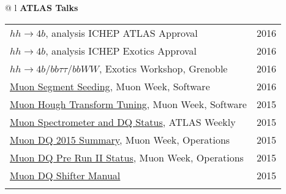 \documentclass[letterpaper,11pt,oneside]{article}
\newcommand{\blue}[1]{\textcolor[rgb]{0,0,0.9}{#1}}
\begin{document}
\begin{flushleft}
\begin{tabular}{@{} l}
     \textbf{ATLAS Talks} \\
     \begin{tabular}{@{} l l }
     \blue{\href{https://indico.cern.ch/event/558982/contributions/2255258}{$hh\to4b$}}, analysis ICHEP ATLAS Approval & 2016\\
     \blue{\href{https://indico.cern.ch/event/556566/contributions/2244051}{$hh\to4b$}}, analysis ICHEP Exotics Approval & 2016\\
     \blue{\href{https://indico.cern.ch/event/465157/contributions/1972449}{$hh\to4b / bb\tau\tau / bbWW$}}, Exotics Workshop, Grenoble & 2016\\
      \blue{\href{https://indico.cern.ch/event/570115/contributions/2305843}{Muon Segment Seeding}}, Muon Week, Software & 2016\\
     \blue{\href{https://indico.cern.ch/event/465396/contributions/1984207}{Muon Hough Transform Tuning}}, Muon Week, Software & 2015\\
     \blue{\href{https://indico.cern.ch/event/444054/contributions/1099850}{Muon Spectrometer and DQ Status}}, ATLAS Weekly & 2015\\
     \blue{\href{https://indico.cern.ch/event/464848/contributions/1983327}{Muon DQ 2015 Summary}}, Muon Week, Operations & 2015\\
     \blue{\href{https://indico.cern.ch/event/376175/contributions/893495}{Muon DQ Pre Run II Status}}, Muon Week, Operations & 2015\\
     \blue{\href{https://twiki.cern.ch/twiki/pub/Atlas/MuonOfflineDQShiftInstructions/Muondq_instruction_tony_2015spring.pdf}{Muon DQ Shifter Manual}} & 2015\\
     \hspace{0.8\linewidth} & \hspace{0.1\linewidth} \\
      \end{tabular}
      \end{tabular}
\end{flushleft}
\end{document}
